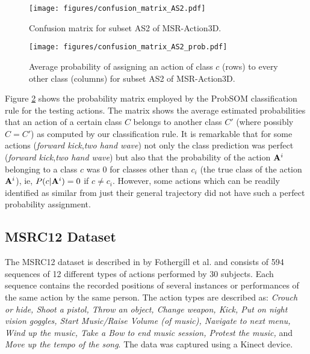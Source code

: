 \documentclass{fcs}
\begin{document}
\begin{figure}
\texttt{[image: figures/confusion\_matrix\_AS2.pdf]}
\centering
\caption{Confusion matrix for subset AS2 of MSR-Action3D.}
\label{figure_confMatrix_AS2}
\end{figure} 

\begin{figure}
\texttt{[image: figures/confusion\_matrix\_AS2\_prob.pdf]}
\centering
\caption{ Average probability of assigning an action of class $c$ (rows) to every other class (columns) for subset AS2 of MSR-Action3D.}
\label{figure_probMatrix_AS2}
\end{figure} 

Figure \ref{figure_probMatrix_AS2} shows the probability matrix employed by the ProbSOM classification rule for the testing actions. The matrix shows the average estimated probabilities that an action of a certain class $C$ belongs to another class $C'$ (where possibly $C=C'$) as computed by our classification rule. It is remarkable that for some actions (\textit{forward kick},\textit{two hand wave}) not only the class prediction was perfect (\textit{forward kick},\textit{two hand wave}) but also that the probability of the action $\mathbf{A}^i$ belonging to a class $c$ was $0$ for classes other than $c_i$ (the true class of the action $\mathbf{A}^i$), ie, $P(c |\mathbf{A}^i)=0$ if $c \neq c_i$. However, some actions which can be readily identified as similar from just their general trajectory did not have such a perfect probability assignment.








 
\subsection{MSRC12 Dataset}
\label{msrc12}


The MSRC12 dataset is described in \cite{fothergill2012instructing} by Fothergill et al. and consists of 594 sequences of 12 different types of actions performed by 30 subjects. Each sequence contains the recorded positions of several instances or performances of the same action by the same person. The action types are described as: \textit{Crouch or hide, Shoot a pistol, Throw an object, Change weapon, Kick, Put on night vision goggles, Start Music/Raise Volume (of music), Navigate to next menu, Wind up the music, Take a Bow to end music session, Protest the music,} and \textit{Move up the tempo of the song}. The data was captured using a Kinect device. 
\end{document}
